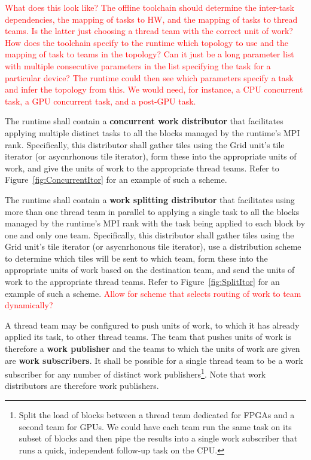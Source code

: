 \documentclass{article}
\begin{document}
\textcolor{red}{What does this look like?  The offline toolchain should
determine the inter-task dependencies, the mapping of tasks to HW, and the
mapping of tasks to thread teams.  Is the latter just choosing a thread team
with the correct unit of work?  How does the toolchain specify to the runtime
which topology to use and the mapping of task to teams in the topology?  Can it
just be a long parameter list with multiple consecutive parameters in the list
specifying the task for a particular device?  The runtime could then see which
parameters specify a task and infer the topology from this.  We would need, for
instance, a CPU concurrent task, a GPU concurrent task, and a post-GPU task.}

\begin{req}
The runtime shall contain a \textbf{concurrent work distributor} that
facilitates applying multiple distinct tasks to all the blocks managed by the
runtime's MPI rank.  Specifically, this distributor shall gather tiles using the
Grid unit's tile iterator (or asycnrhonous tile iterator), form these into the
appropriate units of work, and give the units of work to the appropriate thread
teams.  Refer to Figure~\ref{fig:ConcurrentItor} for an example of such a scheme.
\end{req}

\begin{req}
The runtime shall contain a \textbf{work splitting distributor} that facilitates
using more than one thread team in parallel to applying a single task to all the
blocks managed by the runtime's MPI rank with the task being applied to
each block by one and only one team.  Specifically, this distributor shall
gather tiles using the Grid unit's tile iterator (or asycnrhonous tile
iterator), use a distribution scheme to determine which tiles will be sent to
which team, form these into the appropriate units of work based on the
destination team, and send the units of work to the appropriate thread teams.
Refer to Figure~\ref{fig:SplitItor} for an example of such a scheme.
\textcolor{red}{Allow for scheme that selects routing of work to team
dynamically?}
\end{req}

\begin{req}
A thread team may be configured to push units of work, to which it has already
applied its task, to other thread teams.  The team that pushes units of work is
therefore a \textbf{work publisher} and the teams to which the units of work are
given are \textbf{work subscribers}.  It shall be possible for a single thread
team to be a work subscriber for any number of distinct work
publishers\footnote{Split the load of blocks between a thread team dedicated for
FPGAs and a second team for GPUs.  We could have each team run the same task on
its subset of blocks and then pipe the results into a single work subscriber
that runs a quick, independent follow-up task on the CPU.}.  Note that work
distributors are therefore work publishers.
\end{req}
\end{document}
